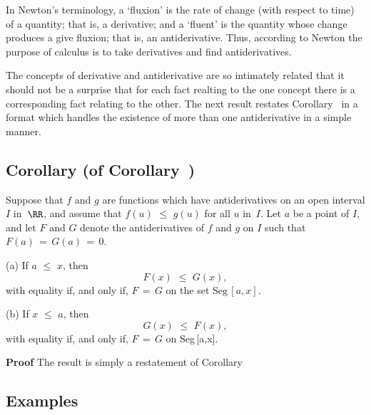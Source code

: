 {\noindent In Newton's terminology, a `fluxion' is the rate of change (with respect to time) of a quantity; that is, a derivative;
    and a `fluent' is the quantity whose change produces a give fluxion; that is, an antiderivative.
    Thus, according to Newton the purpose of calculus is to take derivatives and find antiderivatives.



\VV

       The concepts of derivative and antiderivative are so intimately related that it should not be a surprise that for each fact realting to the one concept there is a corresponding fact relating to the other.
    The next result restates Corollary~ in a format which handles the existence of more than one antiderivative in a simple manner.

\V

             \subsection{\small{\bf Corollary (of Corollary~)}}
            \label{CorE45.75}

\V

        Suppose that $f$ and $g$ are functions which have antiderivatives on an open interval $I$ in~${\RR}$,
    and assume that $f(u)\,\,{\leq}\,\,g(u)$ for all $u$ in~$I$. Let $a$ be a point of $I$,
    and let $F$ and $G$ denote the antiderivatives of $f$ and $g$ on $I$ such that $F(a) \,=\, G(a) \,=\, 0$.


\V

      (a) If $a\,\,{\leq}\,\,x$, then      
        \begin{displaymath}
        F(x)\,\,{\leq}\,\,G(x),
        \end{displaymath}
    with equality if, and only if, $F \,=\, G$ on the set $\mbox{Seg}\,[a,x]$.

\V

        (b) If $x\,\,{\leq}\,\,a$, then
        \begin{displaymath}
        G(x)\,\,{\leq}\,\,F(x),
        \end{displaymath}
    with equality if, and only if, $F \,=\, G$ on {\mbox{Seg}\,[a,x]}.

\V

{\bf Proof} The result is simply a restatement of Corollary~ \Q

\VV

             \subsection{\small{\bf Examples}}
            \label{ExampE45.75A}

}
